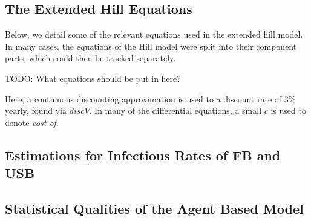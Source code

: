 \documentclass{amsart}
\begin{document}
\subsection{The Extended Hill Equations}
\label{sec:extendedHillEqs}
Below, we detail some of the relevant equations used in the extended hill model.
In many cases, the equations of the Hill model were split into their component
parts, which could then be tracked separately. 

{\huge \color{red} TODO: What equations should be put in here?}

Here, a continuous discounting approximation is used to a discount rate of $3\%$
yearly, found via $discV$. In many of the differential equations, a small $c$ is
used to denote \emph{cost of}. 
\FloatBarrier
\subsection{Estimations for Infectious Rates of FB and USB}

\subsection{Statistical Qualities of the Agent Based Model}
\end{document}
